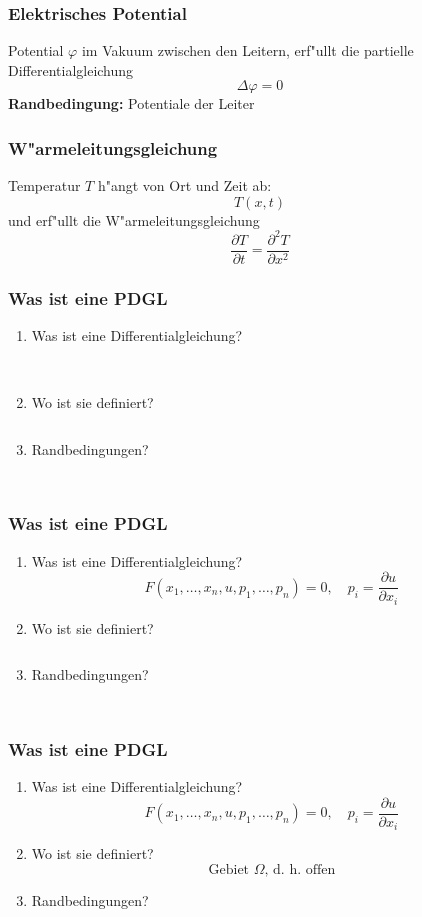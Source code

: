 \begin{frame}
\frametitle{Elektrisches Potential}
Potential 
$\varphi$ 
im Vakuum zwischen den Leitern,
\pause
erf"ullt die partielle Differentialgleichung
\[
\Delta \varphi =0
\]
\pause
{\bf Randbedingung:} Potentiale der Leiter
\end{frame}

\begin{frame}
\frametitle{W"armeleitungsgleichung}
Temperatur $T$ h"angt von Ort und Zeit ab:
\[
T(x,t)
\]
\pause
und erf"ullt die W"armeleitungsgleichung
\[
\frac{\partial T}{\partial t}=\frac{\partial^2T}{\partial x^2}
\]
\end{frame}

\begin{frame}
\frametitle{Was ist eine PDGL}
\begin{enumerate}
\item Was ist eine Differentialgleichung?
\[
\phantom{
F( x_1,\dots,x_n,u,p_1, \dots,p_n) =0,\quad p_i=\frac{\partial u}{\partial x_i}
}
\]
\item Wo ist sie definiert?
\[
\phantom{
\text{Gebiet $\Omega$, d.~h.~offen}
}
\]
\item Randbedingungen?
\[
\phantom{
\text{$u(x)=g(x)$ oder $\frac{\partial u}{\partial n}=g(x)$ auf
$\partial\Omega$}
}
\]
\end{enumerate}
\end{frame}

\begin{frame}
\frametitle{Was ist eine PDGL}
\begin{enumerate}
\item Was ist eine Differentialgleichung?
\[
F( x_1,\dots,x_n,u,p_1, \dots,p_n) =0,\quad p_i=\frac{\partial u}{\partial x_i}
\]
\item Wo ist sie definiert?
\[
\phantom{
\text{Gebiet $\Omega$, d.~h.~offen}
}
\]
\item Randbedingungen?
\[
\phantom{
\text{$u(x)=g(x)$ oder $\frac{\partial u}{\partial n}=g(x)$ auf
$\partial\Omega$}
}
\]
\end{enumerate}
\end{frame}

\begin{frame}
\frametitle{Was ist eine PDGL}
\begin{enumerate}
\item Was ist eine Differentialgleichung?
\[
F( x_1,\dots,x_n,u,p_1, \dots,p_n) =0,\quad p_i=\frac{\partial u}{\partial x_i}
\]
\item Wo ist sie definiert?
\[
\text{Gebiet $\Omega$, d.~h.~offen}
\]
\item Randbedingungen?
\[
\phantom{
\text{$u(x)=g(x)$ oder $\frac{\partial u}{\partial n}=g(x)$ auf
$\partial\Omega$}
}
\]
\end{enumerate}
\end{frame}

